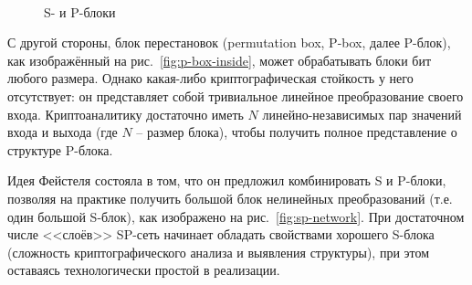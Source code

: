 \begin{figure}[H]
    \centering
    ~~~
		\caption{S- и P-блоки}
\end{figure}

С другой стороны, блок перестановок (permutation box, P-box, далее P-блок), как изображённый на рис.~\ref{fig:p-box-inside}, может обрабатывать блоки бит любого размера. Однако какая-либо криптографическая стойкость у него отсутствует: он представляет собой тривиальное линейное преобразование своего входа. Криптоаналитику достаточно иметь $N$ линейно-независимых пар значений входа и выхода (где $N$ -- размер блока), чтобы получить полное представление о структуре P-блока.

Идея Фейстеля состояла в том, что он предложил комбинировать S и P-блоки, позволяя на практике получить большой блок нелинейных преобразований (т.е. один большой S-блок), как изображено на рис.~\ref{fig:sp-network}. При достаточном числе <<слоёв>> SP-сеть начинает обладать свойствами хорошего S-блока (сложность криптографического анализа и выявления структуры), при этом оставаясь технологически простой в реализации.

